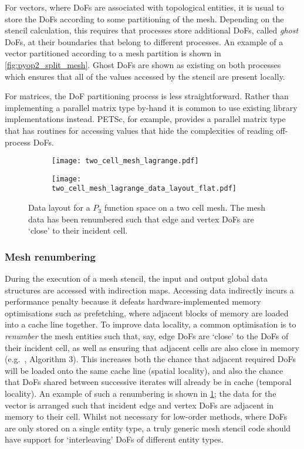 \documentclass[thesis]{subfiles}
\begin{document}
For vectors, where DoFs are associated with topological entities, it is usual to store the DoFs according to some partitioning of the mesh.
Depending on the stencil calculation, this requires that processes store additional DoFs, called \emph{ghost} DoFs, at their boundaries that belong to different processes.
An example of a vector partitioned according to a mesh partition is shown in \cref{fig:pyop2_split_mesh}.
Ghost DoFs are shown as existing on both processes which ensures that all of the values accessed by the stencil are present locally.

For matrices, the DoF partitioning process is less straightforward.
Rather than implementing a parallel matrix type by-hand it is common to use existing library implementations instead.
PETSc, for example, provides a parallel matrix type that has routines for accessing values that hide the complexities of reading off-process DoFs.

\begin{figure}
  \centering
  \begin{subfigure}{\textwidth}
    \centering
    \texttt{[image: two\_cell\_mesh\_lagrange.pdf]}
    \vspace{1em}
  \end{subfigure}
  \begin{subfigure}{\textwidth}
    \centering
    \texttt{[image: two\_cell\_mesh\_lagrange\_data\_layout\_flat.pdf]}
  \end{subfigure}
  \caption{
    Data layout for a $P_3$ function space on a two cell mesh.
    The mesh data has been renumbered such that edge and vertex DoFs are `close' to their incident cell.
  }
  \label{fig:mesh_renumbering_demo}
\end{figure}

\subsubsection{Mesh renumbering}
\label{sec:intro_mesh_numbering}

During the execution of a mesh stencil, the input and output global data structures are accessed with indirection maps.
Accessing data indirectly incurs a performance penalty because it defeats hardware-implemented memory optimisations such as prefetching, where adjacent blocks of memory are loaded into a cache line together.
To improve data locality, a common optimisation is to \emph{renumber} the mesh entities such that, say, edge DoFs are `close' to the DoFs of their incident cell, as well as ensuring that adjacent cells are also close in memory (e.g.~\cite{langeEfficientMeshManagement2016}, Algorithm 3).
This increases both the chance that adjacent required DoFs will be loaded onto the same cache line (spatial locality), and also the chance that DoFs shared between successive iterates will already be in cache (temporal locality).
An example of such a renumbering is shown in \cref{fig:mesh_renumbering_demo}; the data for the vector is arranged such that incident edge and vertex DoFs are adjacent in memory to their cell.
Whilst not necessary for low-order methods, where DoFs are only stored on a single entity type, a truly generic mesh stencil code should have support for `interleaving' DoFs of different entity types.
\end{document}
